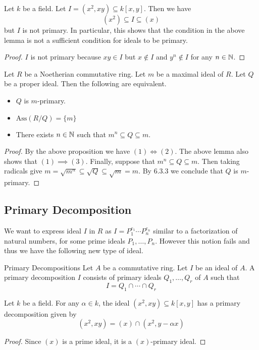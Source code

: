 \documentclass[a4paper]{article}
\begin{document}
\begin{eg}{}{} Let $k$ be a field. Let $I=(x^2,xy)\subseteq k[x,y]$. Then we have $$(x^2)\subseteq I\subseteq(x)$$ but $I$ is not primary. In particular, this shows that the condition in the above lemma is not a sufficient condition for ideals to be primary. 
\begin{proof}
$I$ is not primary because $xy\in I$ but $x\notin I$ and $y^n\notin I$ for any $n\in\mathbb{N}$. 
\end{proof}
\end{eg}

\begin{crl}{}{} Let $R$ be a Noetherian commutative ring. Let $m$ be a maximal ideal of $R$. Let $Q$ be a proper ideal. Then the following are equivalent. 
\begin{itemize}
\item $Q$ is $m$-primary. 
\item $\text{Ass}(R/Q)=\{m\}$
\item There exists $n\in\mathbb{N}$ such that $m^n\subseteq Q\subseteq m$. 
\end{itemize} 
\begin{proof}
By the above proposition we have $(1)\iff(2)$. The above lemma also shows that $(1)\implies(3)$. Finally, suppose that $m^n\subseteq Q\subseteq m$. Then taking radicals give $m=\sqrt{m^n}\subseteq\sqrt{Q}\subseteq\sqrt{m}=m$. By 6.3.3 we conclude that $Q$ is $m$-primary. 
\end{proof}
\end{crl}

\subsection{Primary Decomposition}
We want to express ideal $I$ in $R$ as $I=P_1^{e_1}\cdots P_n^{e_n}$ similar to a factorization of natural numbers, for some prime ideals $P_1,\dots,P_n$. However this notion fails and thus we have the following new type of ideal. 

\begin{defn}{Primary Decompositions}{} Let $A$ be a commutative ring. Let $I$ be an ideal of $A$. A primary decomposition $I$ consists of primary ideals $Q_1,\dots,Q_r$ of $A$ such that $$I=Q_1\cap\cdots\cap Q_r$$
\end{defn}

\begin{eg}{}{} Let $k$ be a field. For any $\alpha\in k$, the ideal $(x^2,xy)\subseteq k[x,y]$ has a primary decomposition given by $$(x^2,xy)=(x)\cap(x^2,y-\alpha x)$$ 
\begin{proof}
Since $(x)$ is a prime ideal, it is a $(x)$-primary ideal. 
\end{proof}
\end{eg}
\end{document}
